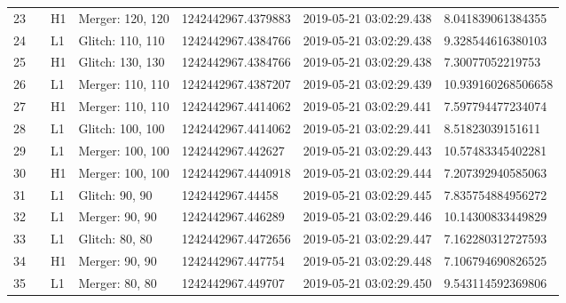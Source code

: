 \begin{longtable}{lllllll}
23   &                                                    &       H1 &  Merger: 120, 120 &  1242442967.4379883 &  2019-05-21 03:02:29.438 &   8.041839061384355 \\
24   &                                                    &       L1 &  Glitch: 110, 110 &  1242442967.4384766 &  2019-05-21 03:02:29.438 &   9.328544616380103 \\
25   &                                                    &       H1 &  Glitch: 130, 130 &  1242442967.4384766 &  2019-05-21 03:02:29.438 &    7.30077052219753 \\
26   &                                                    &       L1 &  Merger: 110, 110 &  1242442967.4387207 &  2019-05-21 03:02:29.439 &  10.939160268506658 \\
27   &                                                    &       H1 &  Merger: 110, 110 &  1242442967.4414062 &  2019-05-21 03:02:29.441 &   7.597794477234074 \\
28   &                                                    &       L1 &  Glitch: 100, 100 &  1242442967.4414062 &  2019-05-21 03:02:29.441 &    8.51823039151611 \\
29   &                                                    &       L1 &  Merger: 100, 100 &   1242442967.442627 &  2019-05-21 03:02:29.443 &   10.57483345402281 \\
30   &                                                    &       H1 &  Merger: 100, 100 &  1242442967.4440918 &  2019-05-21 03:02:29.444 &   7.207392940585063 \\
31   &                                                    &       L1 &    Glitch: 90, 90 &    1242442967.44458 &  2019-05-21 03:02:29.445 &   7.835754884956272 \\
32   &                                                    &       L1 &    Merger: 90, 90 &   1242442967.446289 &  2019-05-21 03:02:29.446 &   10.14300833449829 \\
33   &                                                    &       L1 &    Glitch: 80, 80 &  1242442967.4472656 &  2019-05-21 03:02:29.447 &   7.162280312727593 \\
34   &                                                    &       H1 &    Merger: 90, 90 &   1242442967.447754 &  2019-05-21 03:02:29.448 &   7.106794690826525 \\
35   &                                                    &       L1 &    Merger: 80, 80 &   1242442967.449707 &  2019-05-21 03:02:29.450 &   9.543114592369806 \\

\end{longtable}
